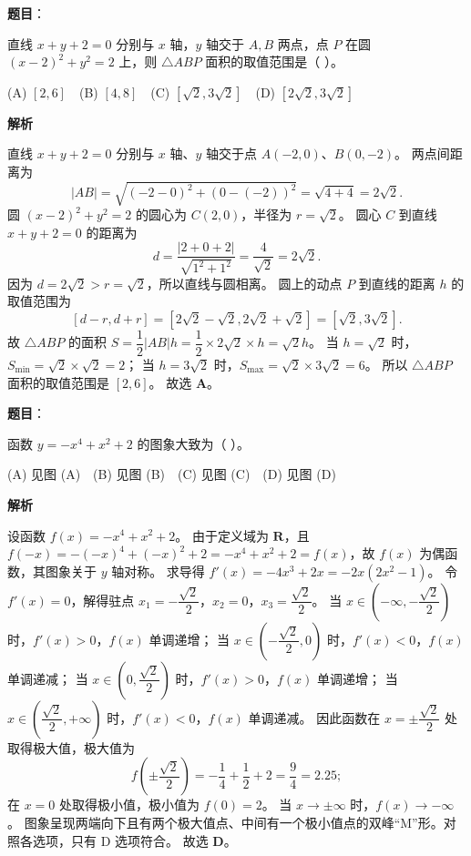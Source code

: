 \begin{answer}

\textbf{题目}：

直线 $x + y + 2 = 0$ 分别与 $x$ 轴，$y$ 轴交于 $A, B$ 两点，点 $P$ 在圆 $(x - 2)^2 + y^2 = 2$ 上，则 $\triangle ABP$ 面积的取值范围是（ ）。

(A) $[2, 6]$　(B) $[4, 8]$　(C) $[\sqrt2, 3\sqrt2]$　(D) $[2\sqrt2, 3\sqrt2]$

\textbf{解析}

直线 $x + y + 2 = 0$ 分别与 $x$ 轴、$y$ 轴交于点 $A(-2, 0)$、$B(0, -2)$。
两点间距离为
\nopagebreak[4]
\[|AB| = \sqrt{(-2 - 0)^2 + (0 - (-2))^2} = \sqrt{4 + 4} = 2\sqrt2.\]
圆 $(x - 2)^2 + y^2 = 2$ 的圆心为 $C(2, 0)$，半径为 $r = \sqrt2$。
圆心 $C$ 到直线 $x + y + 2 = 0$ 的距离为
\nopagebreak[4]
\[d = \dfrac{|2 + 0 + 2|}{\sqrt{1^2 + 1^2}} = \dfrac{4}{\sqrt2} = 2\sqrt2.\]
因为 $d = 2\sqrt2 > r = \sqrt2$，所以直线与圆相离。
圆上的动点 $P$ 到直线的距离 $h$ 的取值范围为
\nopagebreak[4]
\[[d - r, d + r] = [2\sqrt2 - \sqrt2, 2\sqrt2 + \sqrt2] = [\sqrt2, 3\sqrt2].\]
故 $\triangle ABP$ 的面积 $S = \dfrac12 |AB| h = \dfrac12 \times 2\sqrt2 \times h = \sqrt2 h$。
当 $h = \sqrt2$ 时，$S_{\min} = \sqrt2 \times \sqrt2 = 2$；
当 $h = 3\sqrt2$ 时，$S_{\max} = \sqrt2 \times 3\sqrt2 = 6$。
所以 $\triangle ABP$ 面积的取值范围是 $[2, 6]$。
故选 \textbf{A}。


\end{answer}
\begin{answer}

\textbf{题目}：

函数 $y = -x^4 + x^2 + 2$ 的图象大致为（ ）。
\nopagebreak[4]
\begin{center}\end{center}
\nopagebreak[4]
(A) 见图 (A)　(B) 见图 (B)　(C) 见图 (C)　(D) 见图 (D)

\textbf{解析}

设函数 $f(x) = -x^4 + x^2 + 2$。
由于定义域为 $\mathbf{R}$，且 $f(-x) = -(-x)^4 + (-x)^2 + 2 = -x^4 + x^2 + 2 = f(x)$，故 $f(x)$ 为偶函数，其图象关于 $y$ 轴对称。
求导得 $f'(x) = -4x^3 + 2x = -2x(2x^2 - 1)$。
令 $f'(x) = 0$，解得驻点 $x_1 = -\dfrac{\sqrt2}{2}$，$x_2 = 0$，$x_3 = \dfrac{\sqrt2}{2}$。
当 $x \in \left(-\infty, -\dfrac{\sqrt2}{2}\right)$ 时，$f'(x) > 0$，$f(x)$ 单调递增；
当 $x \in \left(-\dfrac{\sqrt2}{2}, 0\right)$ 时，$f'(x) < 0$，$f(x)$ 单调递减；
当 $x \in \left(0, \dfrac{\sqrt2}{2}\right)$ 时，$f'(x) > 0$，$f(x)$ 单调递增；
当 $x \in \left(\dfrac{\sqrt2}{2}, +\infty\right)$ 时，$f'(x) < 0$，$f(x)$ 单调递减。
因此函数在 $x = \pm\dfrac{\sqrt2}{2}$ 处取得极大值，极大值为
\nopagebreak[4]
\[f\left(\pm\dfrac{\sqrt2}{2}\right) = -\dfrac14 + \dfrac12 + 2 = \dfrac94 = 2.25;\]
在 $x = 0$ 处取得极小值，极小值为 $f(0) = 2$。
当 $x \to \pm\infty$ 时，$f(x) \to -\infty$。
图象呈现两端向下且有两个极大值点、中间有一个极小值点的双峰“M”形。对照各选项，只有 D 选项符合。
故选 \textbf{D}。


\end{answer}
